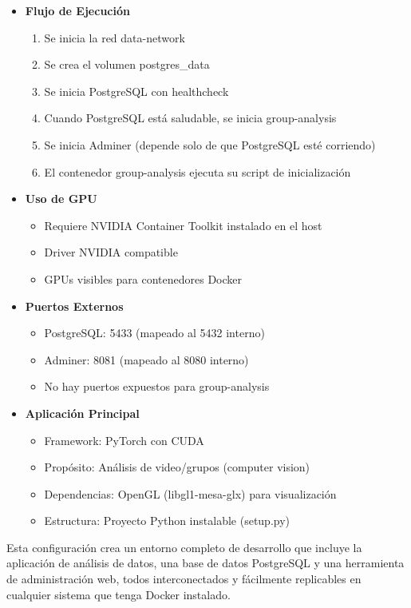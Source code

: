 \begin{itemize}
	\item \textbf{Flujo de Ejecución}
	\begin{enumerate}[label=\alph*.]
		\item Se inicia la red data-network
		\item Se crea el volumen postgres\_data
		\item Se inicia PostgreSQL con healthcheck
		\item Cuando PostgreSQL está saludable, se inicia group-analysis
		\item Se inicia Adminer (depende solo de que PostgreSQL esté corriendo)
		\item El contenedor group-analysis ejecuta su script de inicialización
	\end{enumerate}
	
	\item \textbf{Uso de GPU}
	\begin{itemize}
		\item Requiere NVIDIA Container Toolkit instalado en el host
		\item Driver NVIDIA compatible
		\item GPUs visibles para contenedores Docker
	\end{itemize}
	
	\item \textbf{Puertos Externos}
	\begin{itemize}
		\item PostgreSQL: 5433 (mapeado al 5432 interno)
		\item Adminer: 8081 (mapeado al 8080 interno)
		\item No hay puertos expuestos para group-analysis
	\end{itemize}
	
	\item \textbf{Aplicación Principal}
	\begin{itemize}
		\item Framework: PyTorch con CUDA
		\item Propósito: Análisis de video/grupos (computer vision)
		\item Dependencias: OpenGL (libgl1-mesa-glx) para visualización
		\item Estructura: Proyecto Python instalable (setup.py)
	\end{itemize}
\end{itemize}
Esta configuración crea un entorno completo de desarrollo que incluye la aplicación de análisis de datos, una base de datos PostgreSQL y una herramienta de administración web, todos interconectados y fácilmente replicables en cualquier sistema que tenga Docker instalado.

